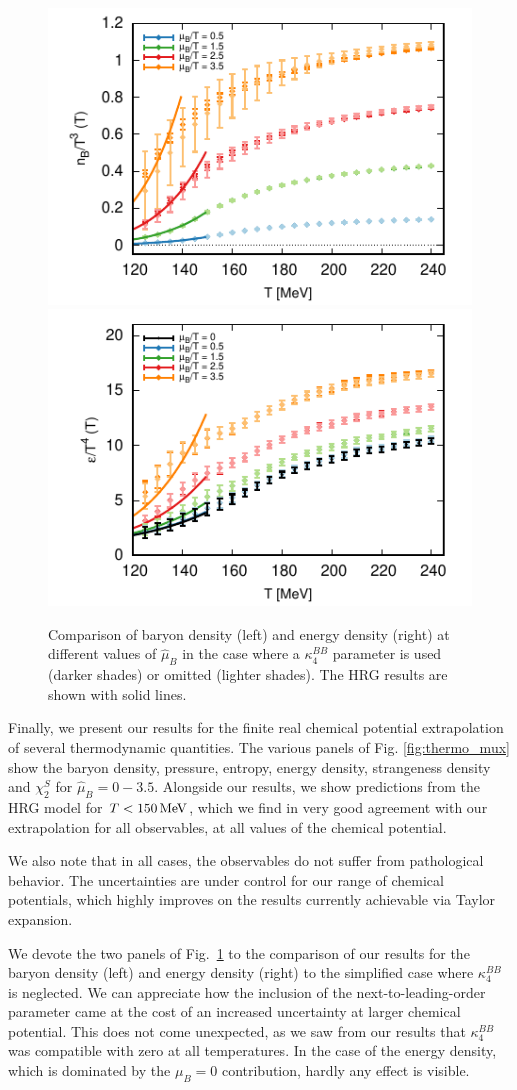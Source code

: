 \documentclass[aps,prd,twocolumn,superscriptaddress]{revtex4-2}
\newcommand \hmu {\hat{\mu}}
\newcommand{\MeV}{\, {\rm MeV}}
\begin{document}
\begin{figure}
\includegraphics[width=0.48\linewidth]{figures/final_bdensity_comp.pdf}
\includegraphics[width=0.48\linewidth]{figures/final_edensity_comp.pdf}
\caption{Comparison of baryon density (left) and energy density (right) at different 
values of $\hmu_B$ in the case where a $\kappa_4^{BB}$ parameter is used (darker shades)
or omitted (lighter shades). The HRG results are shown with solid lines.}
\label{fig:bdens_mux}
\end{figure}

Finally, we present our results for the finite real chemical potential
extrapolation of several thermodynamic quantities. The various panels of Fig. \ref{fig:thermo_mux} show 
the baryon density, pressure, entropy, energy density, strangeness density and 
$\chi_2^S$ for $\hmu_B = 0 - 3.5$.  Alongside our results, we show predictions
from the HRG model for $T < 150 \MeV$, which we find in very good agreement 
with our extrapolation for all observables, at all values of the chemical potential.

We also note that in all cases, the observables do not suffer from pathological 
behavior. The uncertainties are under control for our range of chemical potentials, 
which highly improves on the results currently achievable via Taylor expansion. 

We devote the two panels of Fig.~\ref{fig:bdens_mux} to the comparison of
our results for the baryon density (left) and energy density (right) to the simplified 
case where $\kappa_4^{BB}$ is neglected. We can appreciate how the inclusion of 
the next-to-leading-order parameter came at the cost of an increased uncertainty
at larger chemical potential.  This does not come unexpected, as we saw from our 
results that $\kappa_4^{BB}$ was compatible with zero at all temperatures. In the case 
of the energy density, which is dominated by the $\mu_B=0$ contribution, hardly any 
effect is visible.
\end{document}

